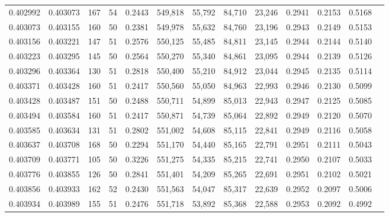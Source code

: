 \begin{tabular}{rrrrrrrrrrrrr}
0.402992 & 0.403073 &   167 &  54 &                                     0.2443 & 549,818 &  55,792 &  84,710 &  23,246 & 0.2941 & 0.2153 & 0.5168 \\
0.403073 & 0.403155 &   160 &  50 &                                     0.2381 & 549,978 &  55,632 &  84,760 &  23,196 & 0.2943 & 0.2149 & 0.5153 \\
0.403156 & 0.403221 &   147 &  51 &                                     0.2576 & 550,125 &  55,485 &  84,811 &  23,145 & 0.2944 & 0.2144 & 0.5140 \\
0.403223 & 0.403295 &   145 &  50 &                                     0.2564 & 550,270 &  55,340 &  84,861 &  23,095 & 0.2944 & 0.2139 & 0.5126 \\
0.403296 & 0.403364 &   130 &  51 &                                     0.2818 & 550,400 &  55,210 &  84,912 &  23,044 & 0.2945 & 0.2135 & 0.5114 \\
0.403371 & 0.403428 &   160 &  51 &                                     0.2417 & 550,560 &  55,050 &  84,963 &  22,993 & 0.2946 & 0.2130 & 0.5099 \\
0.403428 & 0.403487 &   151 &  50 &                                     0.2488 & 550,711 &  54,899 &  85,013 &  22,943 & 0.2947 & 0.2125 & 0.5085 \\
0.403494 & 0.403584 &   160 &  51 &                                     0.2417 & 550,871 &  54,739 &  85,064 &  22,892 & 0.2949 & 0.2120 & 0.5070 \\
0.403585 & 0.403634 &   131 &  51 &                                     0.2802 & 551,002 &  54,608 &  85,115 &  22,841 & 0.2949 & 0.2116 & 0.5058 \\
0.403637 & 0.403708 &   168 &  50 &                                     0.2294 & 551,170 &  54,440 &  85,165 &  22,791 & 0.2951 & 0.2111 & 0.5043 \\
0.403709 & 0.403771 &   105 &  50 &                                     0.3226 & 551,275 &  54,335 &  85,215 &  22,741 & 0.2950 & 0.2107 & 0.5033 \\
0.403776 & 0.403855 &   126 &  50 &                                     0.2841 & 551,401 &  54,209 &  85,265 &  22,691 & 0.2951 & 0.2102 & 0.5021 \\
0.403856 & 0.403933 &   162 &  52 &                                     0.2430 & 551,563 &  54,047 &  85,317 &  22,639 & 0.2952 & 0.2097 & 0.5006 \\
0.403934 & 0.403989 &   155 &  51 &                                     0.2476 & 551,718 &  53,892 &  85,368 &  22,588 & 0.2953 & 0.2092 & 0.4992 \\

\end{tabular}

